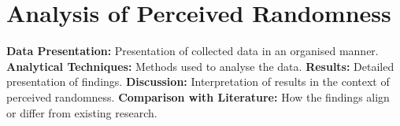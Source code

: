 \section{Analysis of Perceived Randomness}\label{section:Analysis_of_Perceived_Randomness}
\textbf{Data Presentation:} Presentation of collected data in an organised manner.\newline
\textbf{Analytical Techniques:} Methods used to analyse the data.\newline
\textbf{Results:} Detailed presentation of findings.\newline
\textbf{Discussion:} Interpretation of results in the context of perceived randomness.\newline
\textbf{Comparison with Literature:} How the findings align or differ from existing research.\newline